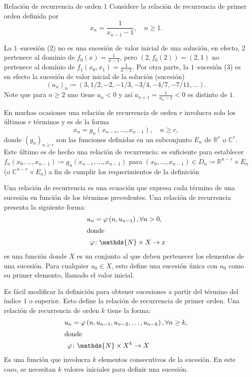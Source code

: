 \begin{example}{Relación de recurrencia de orden $1$}
	Considere la relación de recurrencia de primer orden definida por \[x_{n}=\frac{1}{x_{n-1}-1},\quad n\geq1.\]
\end{example}

La $1$--sucesión (2) no es una sucesión de valor inicial de una solución, en efecto, $2$ pertenece al dominio de $f_{0}\left(x\right)=\frac{1}{x-1}$, pero $\left(2,f_{0}(2)\right)=\left(2,1\right)$ no pertenece al dominio de $f_{1}\left(x_{0},x_{1}\right)=\frac{1}{x-1}$. Por otra parte, la $1$--sucesión (3) es en efecto la sucesión de valor inicial de la solución (sucesión) \[\left(a_{n}\right)_{n}\coloneqq\left(3,1/2,-2,-1/3,-3/4,-4/7,-7/11,\ldots\right).\]
Note que para $n\geq2$ uno tiene $a_{n}<0$ y así $a_{n+1}=\frac{1}{a_{n}-1}<0$ es distinto de $1$.

\begin{example}{}
	En muchas ocasiones una relación de recurrencia de orden $r$ involucra solo los últimos $r$ términos y es de la forma
	\begin{equation*}
	x_{n}=g_{n}\left(x_{n-r},\ldots,x_{n-1}\right),\quad n\geq r,
	\end{equation*}
	donde ${\left(g_{n}\right)}_{n\geq r}$ son las funciones definidas en un subconjunto $E_{n}$ de $\mathds{R}^{r}$ o $\mathds{C}^{r}$. Este último es de hecho una relación de recurrencia: es suficiente para establecer $f_{n}\left(x_{0},\ldots,x_{n-1}\right)\coloneqq g_{n}\left(x_{n-r},\ldots,x_{n-1}\right)$ para $\left(x_{0},\ldots,x_{n-1}\right)\in D_{n}\coloneqq\mathds{R}^{n-r}\times E_{n}$ (o $\mathds{C}^{n-r}\times E_{n}$) a fin de cumplir los requerimientos de la definición %
\end{example}

Una relación de recurrencia es una ecuación que expresa cada término de una sucesión en función de los términos precedentes. Una relación de recurrencia presenta la siguiente forma:
\begin{align*}
u_{n}&=\varphi\left(n,u_{n-1}\right),\forall n>0,\\
\intertext{donde}
\varphi&\colon\mathds{N}\times X\rightarrow x
\end{align*}
es una función donde $X$ es un conjunto al que deben pertenecer los elementos de una sucesión. Para cualquier $u_{0}\in X$, esto define una sucesión única con $u_{0}$ como su primer elemento, llamado el valor inicial.

Es fácil modificar la definición para obtener sucesiones a partir del término del índice $1$ o superior. Esto define la relación de recurrencia de primer orden. Una relación de recurrencia de orden $k$ tiene la forma:
\begin{align*}
u_{n}&=\varphi\left(n,u_{n-1},u_{n-2},\ldots,u_{n-k}\right),\forall n\geq k,\\
\intertext{donde}
\varphi&\colon\mathds{N}\times X^{k}\rightarrow X
\end{align*}
Es una función que involucra $k$ elementos consecutivos de la sucesión. En este caso, se necesitan $k$ valores iniciales para definir una sucesión.

